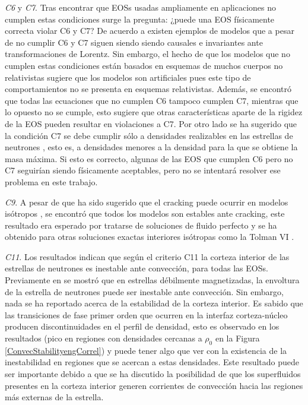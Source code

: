 \emph{C6} y \emph{C7}. Tras encontrar que EOSs usadas ampliamente en aplicaciones no cumplen estas condiciones surge la pregunta: ¿puede una EOS físicamente correcta violar C6 y C7? De acuerdo a \cite{Haensel2007} existen ejemplos de modelos que a pesar de no cumplir C6 y C7 siguen siendo siendo causales e invariantes ante transformaciones de Lorentz. Sin embargo, el hecho de que los modelos que no cumplen estas condiciones están basados en esquemas de muchos cuerpos no relativistas sugiere que los modelos son artificiales pues este tipo de comportamientos no se presenta en esquemas relativistas. Además, se encontró que todas las ecuaciones que no cumplen C6 tampoco cumplen C7, mientras que lo opuesto no se cumple, esto sugiere que otras características aparte de la rigidez de la EOS pueden resultar en violaciones a C7. Por otro lado se ha sugerido que la condición C7 se debe cumplir sólo a densidades realizables en las estrellas de neutrones \cite{Douchin2001}, esto es, a densidades menores a la densidad para la que se obtiene la masa máxima. Si esto es correcto, algunas de las EOS que cumplen C6 pero no C7 seguirían siendo físicamente aceptables, pero no se intentará resolver ese problema en este trabajo.

\emph{C9}. A pesar de que ha sido sugerido que el cracking puede ocurrir en modelos isótropos \cite{Hernandez2018,Gonzalez2014}, se encontró que todos los modelos son estables ante cracking, este resultado era esperado por tratarse de soluciones de fluido perfecto y se ha obtenido para otras soluciones exactas interiores isótropas como la Tolman VI \cite{Herrera1992}.

\emph{C11}. Los resultados indican que según el criterio C11 la corteza interior de las estrellas de neutrones es inestable ante convección, para todas las EOSs. Previamente en \cite{Miralles1997} se mostró que en estrellas débilmente magnetizadas, la envoltura de la estrella de neutrones puede ser inestable ante convección. Sin embargo, nada se ha reportado acerca de la estabilidad de la corteza interior. Es sabido \cite{Haensel2007} que las transiciones de fase primer orden que ocurren en la interfaz corteza-núcleo producen discontinuidades en el perfil de densidad, esto es observado en los resultados (pico en regiones con densidades cercanas a $\rho_0$ en la Figura \ref{ConvecStabilityengCorrel}) y puede tener algo que ver con la existencia de la inestabilidad en regiones que se acercan a estas densidades. Este resultado puede ser importante debido a que se ha discutido la posibilidad de que los superfluidos presentes en la corteza interior generen corrientes de convección hacia las regiones más externas de la estrella. 

